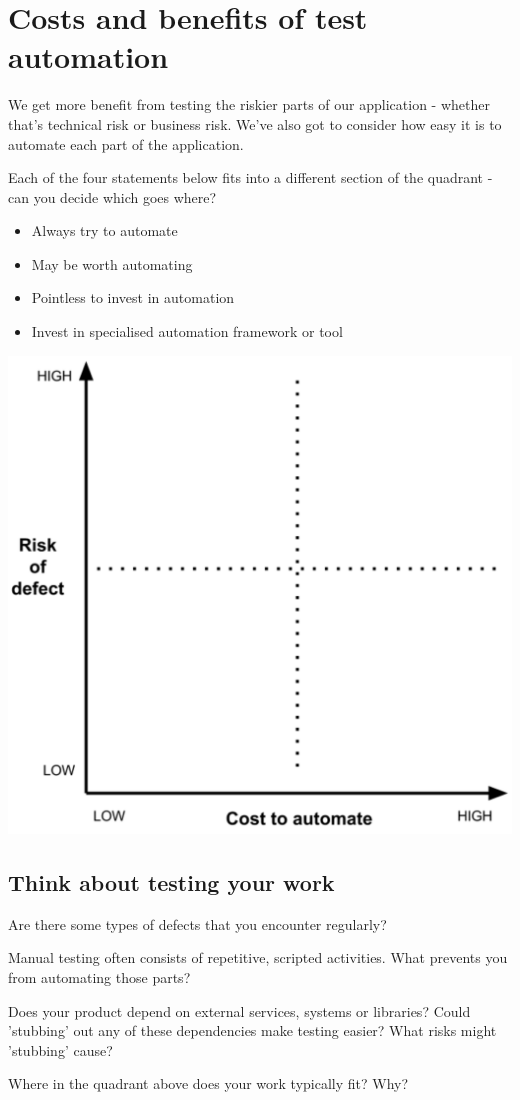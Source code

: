 \chapter*{Costs and benefits of test automation}

We get more benefit from testing the riskier parts of our application - whether that's technical risk or business risk. We've also got to consider how easy it is to automate each part of the application.

Each of the four statements below fits into a different section of the quadrant - can you decide which goes where?

\begin{itemize}
    \item Always try to automate
    \item May be worth automating
    \item Pointless to invest in automation
    \item Invest in specialised automation framework or tool
\end{itemize}

\includegraphics[width=\textwidth]{images/risk-benefit-quadrant}


\section*{Think about testing your work}

Are there some types of defects that you encounter regularly?


Manual testing often consists of repetitive, scripted activities. What prevents you from automating those parts?


Does your product depend on external services, systems or libraries? Could 'stubbing' out any of these dependencies make testing easier? What risks might 'stubbing' cause?


Where in the quadrant above does your work typically fit? Why?

